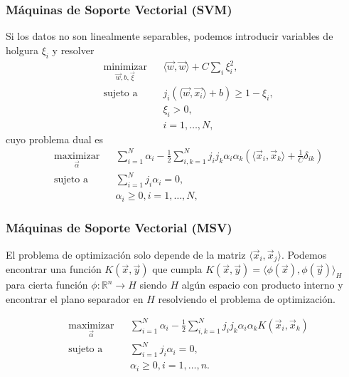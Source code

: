 \documentclass{beamer}
\begin{document}
\begin{frame}
\frametitle{Máquinas de Soporte Vectorial (SVM)}
Si los datos no son linealmente separables, podemos introducir variables de holgura $\xi_i$ y resolver
\begin{equation*}
  \begin{aligned}
    & \underset{\vec{w},b, \vec{\xi}}{\text{minimizar}}
    & & \langle \vec{w}, \vec{w} \rangle +C\sum_i\xi_i^2,\\
    & \text{sujeto a}
    & & j_i(\langle \vec{w}, \vec{x_i}\rangle + b)\geq 1-\xi_i, \\
    & & & \xi_i>0, \\
    & & & i = 1, \ldots, N,
  \end{aligned}
\end{equation*}
cuyo problema dual es
\begin{equation*}\label{eq:problemaOptimizacionDualMSV}
  \begin{aligned}
    & \underset{\vec{\alpha}}{\text{maximizar}}
    & & \sum_{i=1}^N \alpha_i -\frac{1}{2}\sum_{i,k=1}^Nj_ij_k\alpha_i\alpha_k\left( \langle\vec{x}_i, \vec{x}_k\rangle + \frac{1}{C}\delta_{ik}  \right)\\
    & \text{sujeto a}
    & & \sum_{i=1}^Nj_i\alpha_i = 0, \\
    & & & \alpha_i \geq 0, i = 1,\dots,N,
  \end{aligned}
\end{equation*}
\end{frame} 


\begin{frame}
\frametitle{Máquinas de Soporte Vectorial (MSV)}
El problema de optimización solo depende de la matriz $\langle \vec{x}_i, \vec{x}_j\rangle$. Podemos encontrar una función $K(\vec{x}, \vec{y})$ que cumpla $K(\vec{x}, \vec{y}) = \langle \phi(\vec{x}) , \phi(\vec{y})\rangle_{H}$ para cierta función $\phi:\mathbb{R}^n\rightarrow H$ siendo $H$ algún espacio con producto interno y encontrar el plano separador en $H$ resolviendo el problema de optimización.

\begin{equation*}\label{eq:problemaOptimizacionDualKernelMSV}
  \begin{aligned}
    & \underset{\vec{\alpha}}{\text{maximizar}}
    & & \sum_{i=1}^N \alpha_i -\frac{1}{2}\sum_{i,k=1}^Nj_ij_k\alpha_i\alpha_k K\left(\vec{x}_i, \vec{x}_k\right)\\
    & \text{sujeto a}
    & & \sum_{i=1}^Nj_i\alpha_i = 0, \\
    & & & \alpha_i \geq 0 , i = 1,\dots,n. 
  \end{aligned}
\end{equation*}
\end{frame}
\end{document}
